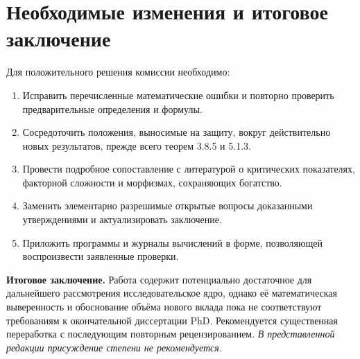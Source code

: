 \documentclass[12pt,a4paper]{article}
\begin{document}
\clearpage
\section{Необходимые изменения и итоговое заключение}

Для положительного решения комиссии необходимо:
\begin{enumerate}
  \item Исправить перечисленные математические ошибки и повторно
  проверить предварительные определения и формулы.
  \item Сосредоточить положения, выносимые на защиту, вокруг
  действительно новых результатов, прежде всего теорем 3.8.5
  и 5.1.3.
  \item Провести подробное сопоставление с литературой о критических
  показателях, факторной сложности и морфизмах, сохраняющих богатство.
  \item Заменить элементарно разрешимые открытые вопросы доказанными
  утверждениями и актуализировать заключение.
  \item Приложить программы и журналы вычислений в форме,
  позволяющей воспроизвести заявленные проверки.
\end{enumerate}

\noindent\textbf{Итоговое заключение.}
Работа содержит потенциально достаточное для дальнейшего рассмотрения
исследовательское ядро, однако её математическая выверенность
и обоснование объёма нового вклада пока не соответствуют требованиям
к окончательной диссертации PhD. Рекомендуется существенная переработка
с последующим повторным рецензированием.
\emph{В представленной редакции присуждение степени не рекомендуется.}
\end{document}
